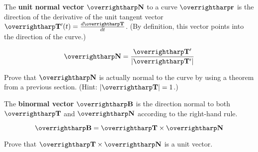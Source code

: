 \documentclass[letterpaper, twoside, 12pt]{book}
\begin{document}
\begin{definition}
  The \textbf{unit normal vector} $\vect{N}$ to a curve $\vect{r}$ is the
  direction of the derivative of the unit tangent vector
  $\vect{T}'(t)=\frac{d\vect{T}}{dt}$.
  (By definition, this vector points into the direction of the curve.)
\end{definition}

\begin{theorem}
  \[
    \vect{N} = \frac{\vect{T}'}{|\vect{T}'|}
  \]
\end{theorem}

          \begin{problem}
            Prove that $\vect{N}$ is actually normal to the curve by
            using a theorem from a previous section. (Hint: $|\vect{T}|=1$.)
          \end{problem}

          \begin{solution}

          \end{solution}

\begin{definition}
  The \textbf{binormal vector} $\harpvec{B}$ is the direction
  normal to both $\harpvec{T}$ and $\harpvec{N}$ according to
  the right-hand rule.
\end{definition}

\begin{theorem}
  \[
    \vect{B}=\vect{T}\times\vect{N}
  \]
\end{theorem}

          \begin{problem}
            Prove that $\vect{T}\times\vect{N}$ is a unit vector.
          \end{problem}

          \begin{solution}

          \end{solution}



\end{document}
